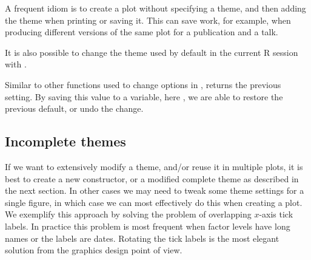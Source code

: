 \documentclass[krantz2]{krantz}\usepackage{knitr}
\begin{document}
A frequent idiom is to create a plot without specifying a theme, and then adding the theme when printing or saving it. This can save work, for example, when producing different versions of the same plot for a publication and a talk.

\begin{knitrout}\footnotesize
{}\color{fgcolor}\begin{kframe}
\begin{alltt}
 \hlkwb{<-}   \hlopt{+}
       \hlstd{()}
 \hlopt{+} \hlstd{())}
\end{alltt}
\end{kframe}
\end{knitrout}

It is also possible to change the theme used by default in the current R session with .

\begin{knitrout}\footnotesize
{}\color{fgcolor}\begin{kframe}
\begin{alltt}
 \hlkwb{<-} \hlstd{(}\hlstd{(}\hlstd{))}
\end{alltt}
\end{kframe}
\end{knitrout}

Similar to other functions used to change options in \Rlang,  returns the previous setting. By saving this value to a variable, here , we are able to restore the previous default, or undo the change.

\begin{knitrout}\footnotesize
{}\color{fgcolor}\begin{kframe}
\begin{alltt}
\end{alltt}
\end{kframe}
\end{knitrout}

\subsection{Incomplete themes}
If we want to extensively modify a theme, and/or reuse it in multiple plots, it is best to create a new constructor, or a modified complete theme as described in the next section. In other cases we may need to tweak some theme settings for a single figure, in which case we can most effectively do this when creating a plot. We exemplify this approach by solving the problem of overlapping $x$-axis tick labels. In practice this problem is most frequent when factor levels have long names or the labels are dates. Rotating the tick labels is the most elegant solution from the graphics design point of view.
\end{document}
